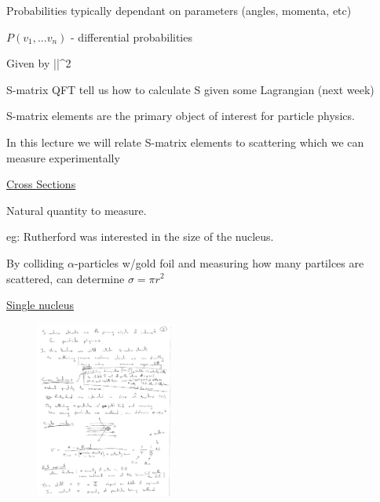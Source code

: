 {Probabilities typically dependant on parameters (angles, momenta, etc) 

\begin{center}
$P(v_1, ... v_n)$ - differential probabilities
\end{center}

Given by 
\be
||^2
\ee


\be
{} \hspace{1in} \textrm{S-matrix}
\ee
QFT tell us how to calculate S given some Lagrangian (next week)

S-matrix elements are the primary object of interest for particle physics. 

In this lecture we will relate S-matrix elements to scattering 
which we can measure experimentally

\clearpage

\underline{\underline{Cross Sections}}


Natural quantity to measure. 

eg: Rutherford was interested in the size of the nucleus. 

By colliding $\alpha$-particles w/gold foil and measuring how many partilces are scattered, can determine $\sigma = \pi r^2$

\underline{Single nucleus}
\begin{figure}[h]
\centering
\includegraphics[width=0.4\textwidth]{./Scattering}
\end{figure}

}

